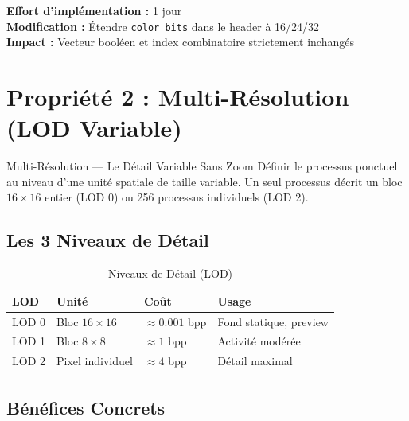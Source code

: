 \documentclass[12pt,a4paper]{article}
\begin{document}
	\begin{techbox}
		\textbf{Effort d'implémentation :} 1 jour \\
		\textbf{Modification :} Étendre \texttt{color\_bits} dans le header à 16/24/32 \\
		\textbf{Impact :} Vecteur booléen et index combinatoire strictement inchangés
	\end{techbox}
	
	\section{Propriété 2 : Multi-Résolution (LOD Variable)}
	
	\begin{featurebox}{Multi-Résolution — Le Détail Variable Sans Zoom}
		Définir le processus ponctuel au niveau d'une unité spatiale de taille variable. Un seul processus décrit un bloc $16 \times 16$ entier (LOD 0) ou 256 processus individuels (LOD 2).
	\end{featurebox}
	
	\subsection{Les 3 Niveaux de Détail}
	
	\begin{table}[h]
		\centering
		\caption{Niveaux de Détail (LOD)}
		\label{tab:lod}
		\begin{tabular}{@{}llll@{}}
			\toprule
			\textbf{LOD} & \textbf{Unité} & \textbf{Coût} & \textbf{Usage} \\ \midrule
			LOD 0 & Bloc $16 \times 16$ & $\approx 0.001$ bpp & Fond statique, preview \\
			LOD 1 & Bloc $8 \times 8$ & $\approx 1$ bpp & Activité modérée \\
			LOD 2 & Pixel individuel & $\approx 4$ bpp & Détail maximal \\
			\bottomrule
		\end{tabular}
	\end{table}
	
	\subsection{Bénéfices Concrets}
	
\end{document}
